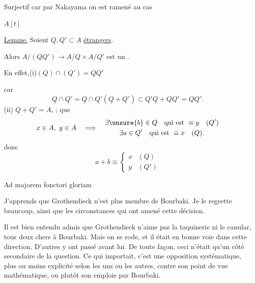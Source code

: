 Surjectif car par Nakayama on est ramené au cas

$A[t]$

\uline{Lemme.} Soient $Q,Q'\subset A$ \uline{ étrangers}.

Alors $A/(QQ')\longrightarrow A/Q\times A/Q'$ est un .

En effet,\quad (i)\quad $(Q)\cap(Q')=QQ'$

car
\[
\underline Q\cap\underline {Q'}=\underline Q\cap\underline {Q'}(\underline Q+\underline {Q'})
\subset\underline {Q'}\underline Q+QQ'=QQ'.
\]
(ii) $\underline Q+\underline {Q'}=A$, ;  que
\[
x\in A,\ y\in A\quad\Longrightarrow\quad
\begin{gathered}
\exists\unsure{b}\in Q\quad\text{qui est }\equiv y\quad(Q')\\
\exists a\in Q'\quad\text{qui est }\equiv x\quad(Q).
\end{gathered}
\]
donc
\[
a+b\equiv\begin{cases}x&(Q)\\y&(Q')\end{cases}
\]

\begin{center}Ad majorem fonctori gloriam\end{center}

J'apprends que Grothendieck n'est plus membre de Bourbaki. Je le regrette beaucoup, ainsi que les circonstances qui ont amené cette décision.

Il est bien entendu admis que Grothendieck n'aime pas la taquinerie ni le canular, tous deux chers à Bourbaki. Mais on se rode, et il était en bonne voie dans cette direction. D'autres y ont passé avant lui. De toute façon, ceci n'était qu'un côté secondaire de la question. Ce qui importait, c'est une opposition systématique, plus ou moins explicité selon les uns ou les autres, contre son point de vue mathématique, ou plutôt son emploie par Bourbaki.

